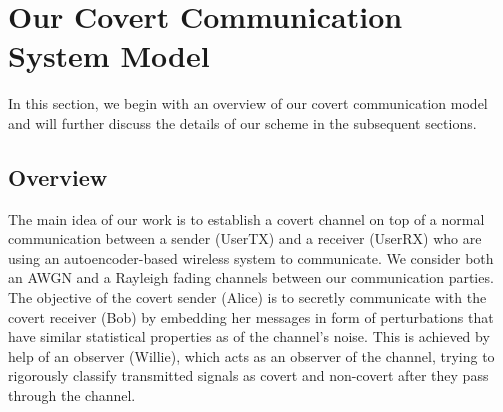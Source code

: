 \section{Our Covert Communication System Model}
\label{s:model}
In this section, we begin with an overview of our covert communication model and will further discuss the details of our scheme in the subsequent sections.
\subsection{Overview}
The main idea of our work is to establish a covert channel on top of a normal communication between a sender (UserTX) and a receiver (UserRX) who are using an autoencoder-based wireless system to communicate. We consider both an AWGN and a Rayleigh fading channels between our communication parties. The objective of the covert sender (Alice) is to secretly communicate with the covert receiver (Bob) by embedding her messages in form of perturbations that have similar statistical properties as of the channel's noise. This is achieved by help of an observer (Willie), which acts as an observer of the channel, trying to rigorously classify transmitted signals as covert and non-covert after they pass through the channel.\\
